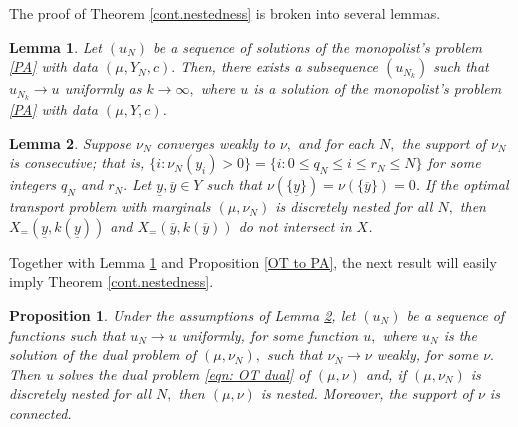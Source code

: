 \documentclass[12pt,reqno]{amsart}
\newtheorem{prop}{Proposition}
\newtheorem{lem}{Lemma}
\begin{document}
The proof of Theorem \ref{cont.nestedness} is broken into several lemmas. 
\begin{lem}\label{conv}
    Let $(u_N)$ be a sequence of solutions of the monopolist's problem \eqref{PA} with data $(\mu, Y_N, c).$ Then, there exists a subsequence $(u_{N_k})$ such that $u_{N_k}\to u$ uniformly as $k\to\infty,$ where $u$ is a solution of the monopolist's problem \eqref{PA} with data $(\mu,Y,c)$.
\end{lem}

\begin{lem}\label{noatoms}
 Suppose $\nu_N$ converges weakly to $\nu,$ and for each $N,$ the support of $\nu_N$ is consecutive; that is, $\{i:\nu_N(y_i)>0\}=\{i:0\le q_N\le i\le r_N\le N\}$ for some integers $q_N$ and $r_N.$  Let $\underline{y},\overline{y}\in Y$ such that $\nu(\{\underline{y}\})=\nu(\{\overline{y}\})=0$. If the optimal transport problem with marginals $(\mu,\nu_N)$ is discretely nested for all $N,$ then $X_=(\underline{y},k(\underline{y}))$ and $X_=(\overline{y},k(\overline{y}))$ do not intersect in  $X$.%
\end{lem}


Together with Lemma \ref{conv} and Proposition \ref{OT to PA}, the next result will easily imply Theorem \ref{cont.nestedness}.
\begin{prop}\label{con.nest}
    Under the assumptions of Lemma \ref{noatoms}, let $(u_N)$ be a sequence of functions such that $u_N\to u$ uniformly, for some function $u,$ where $u_N$ is the solution of the dual problem of $(\mu,\nu_N),$ such that $\nu_N\to \nu$ weakly, for some $\nu.$ Then u solves the dual problem \eqref{eqn: OT dual} of $(\mu,\nu)$ and, if $(\mu,\nu_N)$ is discretely nested for all $N,$ then $(\mu,\nu)$ is nested. Moreover, the support of $\nu$ is connected.
\end{prop}
\end{document}

